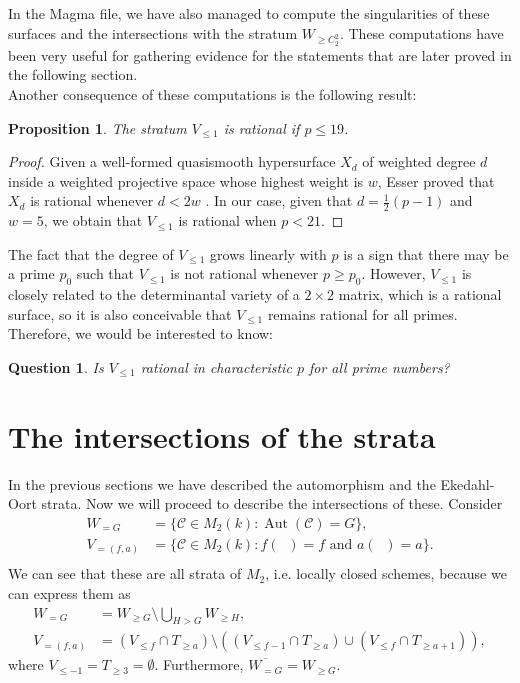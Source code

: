 \documentclass{amsart}
\newcommand{\calC}{\mathcal{C}}
\DeclareMathOperator{\Aut}{Aut}
\DeclareMathOperator{\Jac}{Jac}
\DeclareMathOperator{\Jacc}{\Jac(\mathcal{C})}
\newcommand{\Mtwo}{M_2}
\numberwithin{equation}{section}
\newtheorem{proposition}[theorem]{Proposition}
\newtheorem{question}[theorem]{Question}
\theoremstyle{definition}
\theoremstyle{remark}
\begin{document}
In the Magma file, we have also managed to compute the singularities of these surfaces and the intersections with the stratum $W_{\geq C_2^2}$. These computations have been very useful for gathering evidence for the statements that are later proved in the following section.\\

Another consequence of these computations is the following result:
\begin{proposition}
The stratum $V_{\leq 1}$ is rational if $p\leq19$.
\end{proposition}
\begin{proof}
Given a well-formed quasismooth hypersurface $X_d$ of weighted degree $d$ inside a weighted projective space whose highest weight is $w$, Esser proved that $X_d$ is rational whenever $d<2w$ \cite[Proposition 3.1]{Esser2024RationalHypersurfaces}. In our case, given that $d=\frac{1}{2}(p-1)$ and $w=5$, we obtain that $V_{\leq 1}$ is rational when $p<21$.
\end{proof}
The fact that the degree of $V_{\leq 1}$ grows linearly with $p$ is a sign that there may be a prime $p_0$ such that $V_{\leq 1}$ is not rational whenever $p\geq p_0$. However, $V_{\leq 1}$
is closely related to the determinantal variety of a $2\times 2$ matrix, which is a rational surface, so it is also conceivable that $V_{\leq 1}$ remains rational for all primes.\\

Therefore, we would be interested to know:
\begin{question}
\textit{Is $V_{\leq 1}$ rational in characteristic $p$ for all prime numbers?\\}
\end{question}




\section{The intersections of the strata} \label{intersections_sec}
In the previous sections we have described the automorphism and the Ekedahl-Oort strata. Now we will proceed to describe the intersections of these. Consider
\begin{align*}
W_{= G}&=\{\calC\in \Mtwo(k): \Aut(\calC)= G\},\\ V_{=(f,a)}&=\{\calC\in \Mtwo(k): f(\Jacc)=f \text{ and } a(\Jacc)=a\}.\\
\end{align*}
We can see that these are all strata of $M_2$, i.e. locally closed schemes, because we can express them as
\begin{align*}
W_{= G}&=W_{\geq G}\setminus\bigcup_{H> G} W_{\geq H},\\
V_{=(f,a)}&=\left(V_{\leq f}\cap T_{\geq a}\right)\setminus \left(\left(V_{\leq f-1}\cap T_{\geq a}\right)\cup\left(V_{\leq f}\cap T_{\geq a+1}\right)\right),
\end{align*}
where $V_{\leq-1}=T_{\geq3}=\emptyset$. Furthermore, $\overline{W_{= G}}=W_{\geq G}$.\\
\end{document}
